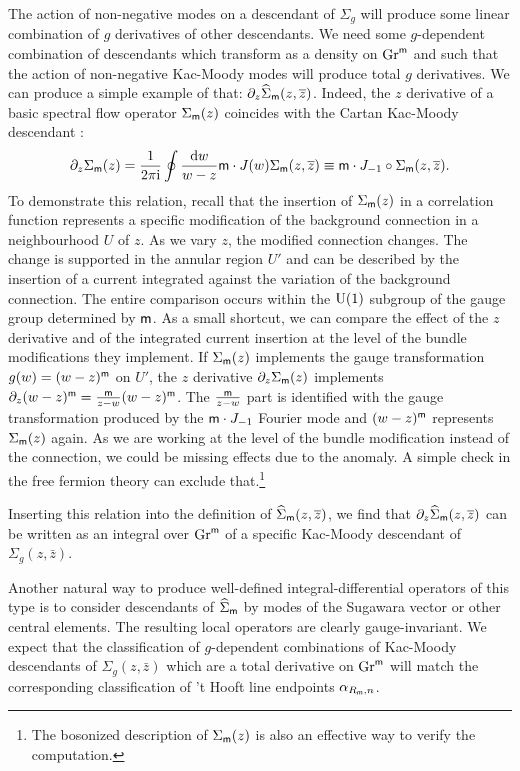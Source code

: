 \documentclass[11pt,a4paper]{article}
\begin{document}
The action of non-negative modes on a descendant of $\Sigma_{g}$ will produce some linear combination of $g$ derivatives of other descendants. We need some $g$-dependent combination of descendants which transform as a density on $\mathrm{Gr}^{\sf m}$ and such that the action of non-negative Kac-Moody modes will produce total $g$ derivatives. We can produce a simple example of that: $\partial_z \widehat\Sigma_{\sf m}(z, \overline z)$. Indeed, the $z$ derivative of a basic spectral flow operator $\Sigma_{\sf m}(z)$ coincides with the Cartan Kac-Moody descendant :
\begin{equation}\label{firstone} \partial_z \Sigma_{\sf m}(z)= \frac{1}{2 \pi {\mathrm i}} \oint \frac{\mathrm d w}{w-z} {\sf m} \cdot J (w) \Sigma_{\sf m}(z, \overline z)\equiv  {\sf m} \cdot J_{-1} \circ \Sigma_{\sf m}(z, \overline z). \end{equation}
To demonstrate this relation, recall that the insertion of $\Sigma_{\sf m}(z)$ in a correlation function represents a specific modification of the background connection in a neighbourhood $U$ of $z$. As we vary $z$, the modified connection changes. The change is supported in the annular region $U'$ and can be described by the insertion of a current integrated against the variation of the background connection. 
The entire comparison occurs within the ${\mathrm U}(1)$ subgroup of the gauge group determined by ${\sf m}$. 
As a small shortcut, we can compare the effect of the $z$ derivative and of the integrated current insertion at the level of the bundle modifications they implement. If $\Sigma_{\sf m}(z)$ implements the gauge transformation $g(w) = (w-z)^{\sf m}$ on $U'$, the $z$ derivative $\partial_z \Sigma_{\sf m}(z)$ implements $\partial_z  (w-z)^{\sf m} = \frac{{\sf m}}{z-w} (w-z)^{\sf m}$. The $\frac{{\sf m}}{z-w}$ part is identified with the gauge transformation produced by the 
${\sf m} \cdot J_{-1}$ Fourier mode and $(w-z)^{\sf m}$ represents $\Sigma_{\sf m}(z)$ again. As we are working at the level of the bundle modification instead of the connection, we could be missing effects due to the anomaly.  A simple check in the free fermion theory can exclude that.\footnote{The bosonized description of $\Sigma_{\sf m}(z)$ is also an effective way to verify the computation.}

Inserting this relation into the definition of $\widehat\Sigma_{\sf m}(z, \overline z)$, we find that $\partial_z \widehat\Sigma_{\sf m}(z, \overline z)$ can be written as an integral over ${\mathrm{Gr}}^{\sf m}$ of a specific Kac-Moody descendant of $\Sigma_{g}(z, \bar z)$. 

Another natural way to produce well-defined integral-differential operators of this type is to consider descendants of 
$\widehat\Sigma_{\sf m}$ by modes of the Sugawara vector or other central elements. The resulting local operators are clearly gauge-invariant. 
We expect that the classification of $g$-dependent combinations of Kac-Moody descendants of $\Sigma_{g}(z, \bar z)$ which are a total derivative on $\mathrm{Gr}^{\sf m}$ will match the corresponding classification of 't Hooft line endpoints $\alpha_{R_{\sf m},n}$. 
\end{document}
